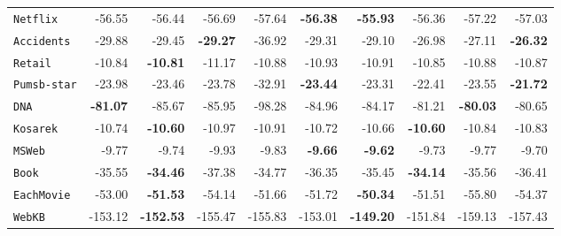 \documentclass[final]{beamer}
\begin{document}
\begin{frame}{}
\begin{textblock}{17.5}
\begin{table}[t]
\begin{tabular}{l r r r r  r | r r r r}
    \texttt{Netflix}    & -56.55                               & -56.44                                & -56.69                 & -57.64  & \textbf{-56.38}  & \textbf{-55.93}  & -56.36         & -57.22          & -57.03          \\ 
    \texttt{Accidents}  & -29.88                               & -29.45                                & \textbf{-29.27}                 & -36.92  & -29.31  & -29.10           & -26.98         & -27.11          & \textbf{-26.32} \\ 
    \texttt{Retail}     & -10.84                               & \textbf{-10.81}                                & -11.17                 & -10.88  & -10.93  & -10.91           & -10.85         & -10.88          & -10.87          \\ 
    \texttt{Pumsb-star} & -23.98                               & -23.46                                & -23.78                 & -32.91  & \textbf{-23.44}  & -23.31           & -22.41         & -23.55          & \textbf{-21.72} \\ 
    \texttt{DNA}        &\textbf{-81.07}                               & -85.67                                & -85.95                 & -98.28  & -84.96  & -84.17           & -81.21         & \textbf{-80.03} & -80.65          \\ 
    \texttt{Kosarek}    & -10.74                               & \textbf{-10.60}                                & -10.97                 & -10.91  & -10.72  & -10.66           & \textbf{-10.60}         & -10.84          & -10.83          \\ 
    \texttt{MSWeb}      & -9.77                                & -9.74                                 & -9.93                  & -9.83   & \textbf{-9.66}   & \textbf{-9.62}   & -9.73          & -9.77           & -9.70           \\ 
    \texttt{Book}       & -35.55                               & \textbf{-34.46}                                & -37.38                 & -34.77  & -36.35  & -35.45           & \textbf{-34.14}         & -35.56          & -36.41          \\ 
    \texttt{EachMovie}  & -53.00                               & \textbf{-51.53}                                & -54.14                 & -51.66  & -51.72  & \textbf{-50.34}  & -51.51         & -55.80          & -54.37          \\ 
    \texttt{WebKB}      & -153.12                              & \textbf{-152.53}                               & -155.47                & -155.83 & -153.01 & \textbf{-149.20} & -151.84        & -159.13         & -157.43         \\ 

\end{tabular}
\end{table}
\end{textblock}
\end{frame}
\end{document}
